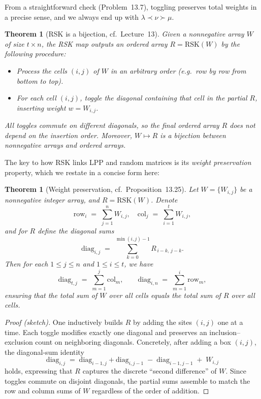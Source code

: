 \documentclass[letterpaper,11pt,oneside,reqno]{article}
\numberwithin{equation}{section}
\newtheorem{theorem}[proposition]{Theorem}
\theoremstyle{definition}
\begin{document}
From a straightforward check (Problem~13.7), toggling preserves total weights in a precise sense, and we always end up with $\lambda\prec \nu\succ \mu$.

\begin{theorem}[RSK is a bijection, cf.\ Lecture~13]
\label{thm:RSK_bijectionRecap}
Given a nonnegative array $W$ of size $t\times n$, the \emph{RSK map} outputs an ordered array $R=\mathrm{RSK}(W)$ by the following procedure:
\begin{itemize}
\item Process the cells $(i,j)$ of $W$ in an arbitrary order (e.g.\ row by row from bottom to top).
\item For each cell $(i,j)$, \emph{toggle} the diagonal containing that cell in the partial $R$, inserting weight $w = W_{i,j}$.
\end{itemize}
All toggles commute on different diagonals, so the final ordered array $R$ does not depend on the insertion order.  Moreover, $W\mapsto R$ is a bijection between nonnegative arrays and ordered arrays.
\end{theorem}

The key to how RSK links LPP and random matrices is its \emph{weight preservation} property, which we restate in a concise form here:

\begin{theorem}[Weight preservation, cf.\ Proposition~13.25]
\label{thm:WeightPreservationRecap}
Let $W=\{W_{i,j}\}$ be a nonnegative integer array, and $R=\mathrm{RSK}(W)$.  Denote
\[
\mathrm{row}_i \;=\; \sum_{j=1}^{n} W_{i,j},
\quad
\mathrm{col}_j \;=\; \sum_{i=1}^{t} W_{i,j},
\]
and for $R$ define the diagonal sums
\[
\mathrm{diag}_{i,j}
\;=\;
\sum_{k=0}^{\min(i,j)-1} R_{\,i-k,\,j-k}.
\]
Then for each $1\le j\le n$ and $1\le i\le t$, we have
\begin{equation}
\label{eq:diagIdentityRecap}
\mathrm{diag}_{t,j}
\;=\;
\sum_{m=1}^{j}\mathrm{col}_{m},
\qquad
\mathrm{diag}_{i,n}
\;=\;
\sum_{m=1}^{i}\mathrm{row}_{m},
\end{equation}
ensuring that the total sum of $W$ over all cells equals the total sum of $R$ over all cells.
\end{theorem}

\begin{proof}[Proof (sketch)]
One inductively builds $R$ by adding the sites $(i,j)$ one at a time.  Each toggle modifies exactly one diagonal and preserves an inclusion--exclusion count on neighboring diagonals.  Concretely, after adding a box $(i,j)$, the diagonal-sum identity
\[
\mathrm{diag}_{i,j}
\;=\;
\mathrm{diag}_{i-1,j} + \mathrm{diag}_{i,j-1}
\;-\;
\mathrm{diag}_{i-1,j-1}
\;+\;
W_{i,j}
\]
holds, expressing that $R$ captures the discrete ``second difference'' of $W$.  Since toggles commute on disjoint diagonals, the partial sums assemble to match the row and column sums of $W$ regardless of the order of addition.
\end{proof}
\end{document}
